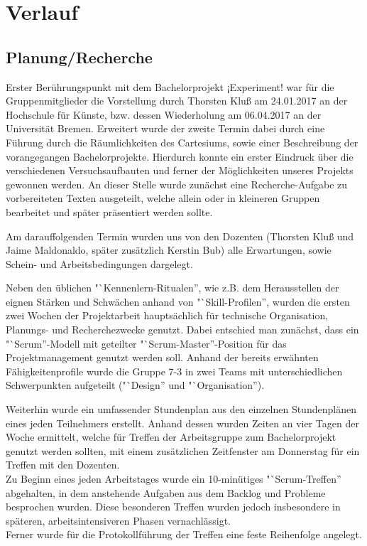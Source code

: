 \documentclass{Bericht}
\begin{document}
\maketitle


\tableofcontents
\clearpage



\section{Verlauf} %
	\subsection{Planung/Recherche} %
		Erster Berührungspunkt mit dem Bachelorprojekt ¡Experiment! war für die Gruppenmitglieder die Vorstellung durch Thorsten Kluß am 24.01.2017 an der Hochschule für Künste, bzw. dessen Wiederholung am 06.04.2017 an der Universität Bremen. Erweitert wurde der zweite Termin dabei durch eine Führung durch die Räumlichkeiten des Cartesiums, sowie einer Beschreibung der vorangegangen Bachelorprojekte. Hierdurch konnte ein erster Eindruck über die verschiedenen Versuchsaufbauten und ferner der Möglichkeiten unseres Projekts gewonnen werden. An dieser Stelle wurde zunächst eine Recherche-Aufgabe zu vorbereiteten Texten ausgeteilt, welche allein oder in kleineren Gruppen bearbeitet und später präsentiert werden sollte.

		Am darauffolgenden Termin wurden uns von den Dozenten (Thorsten Kluß und Jaime Maldonaldo, später zusätzlich Kerstin Bub) alle Erwartungen, sowie Schein- und Arbeitsbedingungen dargelegt.

		Neben den üblichen "`Kennenlern-Ritualen'', wie z.B. dem Herausstellen der eignen Stärken und Schwächen anhand von "`Skill-Profilen'', wurden die ersten zwei Wochen der Projektarbeit hauptsächlich für technische Organisation, Planungs- und Recherchezwecke genutzt. Dabei entschied man zunächst, dass ein "`Scrum''-Modell mit geteilter "`Scrum-Master''-Position für das Projektmanagement genutzt werden soll. Anhand der bereits erwähnten Fähigkeitenprofile wurde die Gruppe 7-3 in zwei Teams mit unterschiedlichen Schwerpunkten aufgeteilt ("`Design'' und "`Organisation'').\\
		
		Weiterhin wurde ein umfassender Stundenplan aus den einzelnen Stundenplänen eines jeden Teilnehmers erstellt. Anhand dessen wurden Zeiten an vier Tagen der Woche ermittelt, welche für Treffen der Arbeitsgruppe zum Bachelorprojekt genutzt werden sollten, mit einem zusätzlichen Zeitfenster am Donnerstag für ein Treffen mit den Dozenten. \\
		Zu Beginn eines jeden Arbeitstages wurde ein 10-minütiges "`Scrum-Treffen'' abgehalten, in dem anstehende Aufgaben aus dem Backlog und Probleme besprochen wurden. Diese besonderen Treffen wurden jedoch insbesondere in späteren, arbeitsintensiveren Phasen vernachlässigt.\\
		Ferner wurde für die Protokollführung der Treffen eine feste Reihenfolge angelegt.
\end{document}
